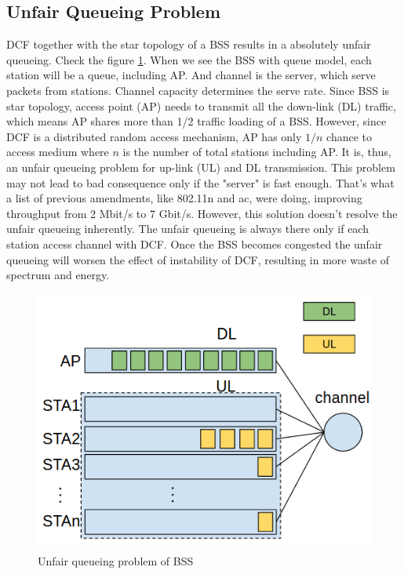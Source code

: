 \subsection*{Unfair Queueing Problem}
DCF together with the star topology of a BSS results in a absolutely unfair queueing. 
Check the figure \ref{fig_unfair_queueing}.
When we see the BSS with queue model, each station will be a queue, including AP.
And channel is the server, which serve packets from stations. Channel capacity determines the serve rate.
Since BSS is star topology, access point (AP) needs to transmit all the down-link (DL) traffic, which means AP shares more than 1/2 traffic loading of a BSS. 
However, since DCF is a distributed random access mechanism, AP has only $1/n$ chance to access medium where $n$ is the number of total stations including AP. It is, thus, an unfair queueing problem for up-link (UL) and DL transmission. 
This problem may not lead to bad consequence only if the "server" is fast enough. 
That's what a list of previous amendments, like 802.11n and ac, were doing, improving throughput from 2 Mbit/s to 7 Gbit/s. 
However, this solution doesn't resolve the unfair queueing inherently. 
The unfair queueing is always there only if each station access channel with DCF.
Once the BSS becomes congested the unfair queueing will worsen the effect of instability of DCF, resulting in more waste of spectrum and energy.
\begin{figure}[!h]
\centering
\includegraphics[scale=0.5]{./figure/chp1/unfair_queueing.png}
\caption{Unfair queueing problem of BSS}
\label{fig_unfair_queueing}
\end{figure}

